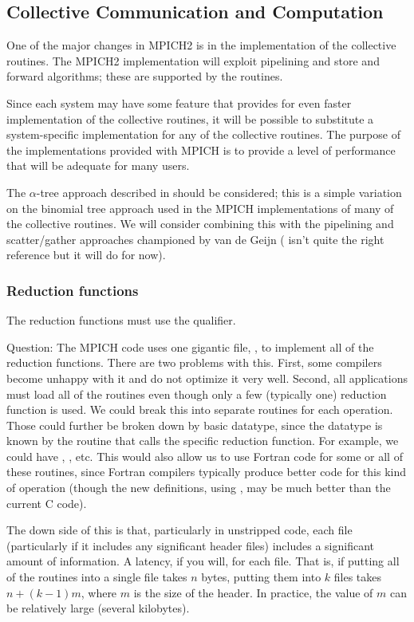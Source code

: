 \documentclass{article}
\begin{document}
\subsection{Collective Communication and Computation}
One of the major changes in MPICH2 is in the implementation of the
collective routines.  The MPICH2 implementation will exploit
pipelining and store and forward algorithms; these are supported by
the  routines.  

Since each system may have some feature that provides for even faster
implementation of the collective routines, it will be possible to
substitute a system-specific implementation for any of the collective
routines.  The purpose of the implementations provided with MPICH is
to provide a level of performance that will be adequate
for many users.  

The $\alpha$-tree approach described in
\cite{bern:mpi-collective:hpcn99} should be considered; this is a
simple variation on the binomial tree approach used in the MPICH
implementations of many of the collective routines.  We will consider
combining this with the pipelining and scatter/gather approaches
championed by van de Geijn (\cite{vandegeijn} isn't quite the right
reference but it will do for now).

\subsubsection{Reduction functions}
The reduction functions must use the  qualifier.

Question:
The MPICH code uses one gigantic file, , to implement
all of the reduction functions.  There are two problems with this.
First, some compilers become unhappy with it and do not optimize it
very well.  Second, all applications must load all of the routines
even though only a few (typically one) reduction function is used.  We
could break this into separate routines for each operation.  Those
could further be broken down by basic datatype, since the datatype is
known by the routine that calls the specific reduction function.  
For example, we could have ,
, etc.  This would also allow us to use Fortran
code for some or all of these routines, since Fortran compilers
typically produce better code for this kind of operation (though the
new definitions, using , may be much better than the
current C code).

The down side of this is that, particularly in unstripped code, each
file (particularly if it includes any significant header files)
includes a significant amount of information.  A latency, if you will,
for each file.  That is, if putting all of the routines into a single
file takes $n$ bytes, putting them into $k$ files takes $n + (k-1)m$,
where $m$ is the size of the header.  In practice, the value of $m$ can be
relatively large (several kilobytes).
\end{document}
